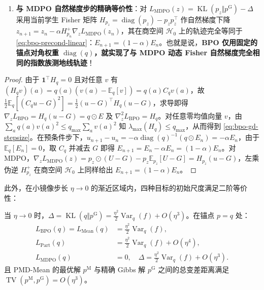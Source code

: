 \documentclass[lang=cn,scheme=chinese,openany]{../book/elegantbook}
\newcommand{\E}{\mathbb E}
\newcommand{\KL}{\operatorname{KL}}
\newcommand{\Var}{\operatorname{Var}}
\newcommand{\TV}{\operatorname{TV}}
\begin{document}
\begin{theorem}
\begin{enumerate}
\begin{equation}
  \label{eq:bpo-precond-linear}
 \end{equation}
 对任意 $\alpha\in(0,2)$ 均全局收缩，且当 $\alpha=1$ 时\textbf{一步（$N=1$）精确抵达 $E_1=0$（即 $p_1=p^{\mathrm G}$）}！
 \item \textbf{与 MDPO 自然梯度步的精确等价性}：对 $L_{\mathrm{MDPO}}(z)=\KL(p_z\Vert p^{\mathrm G})-\Delta$ 采用当前学生 Fisher 矩阵 $H_{p_z}=\operatorname{diag}(p_z)-p_z p_z^\top$ 作自然梯度下降 $z_{n+1}=z_n-\alpha H_{p_n}^+\nabla_z L_{\mathrm{MDPO}}(z_n)$，其在商空间 $\mathcal H_0$ 上的轨迹完全等同于 \cref{eq:bpo-precond-linear}：$E_{n+1}=(1-\alpha)E_n$。也就是说，\textbf{BPO 仅用固定的锚点对角权重 $\operatorname{diag}(q)$，就实现了与 MDPO 动态 Fisher 自然梯度完全相同的指数族测地线轨迹}！
\end{enumerate}
\end{theorem}
\begin{proof}
由于 $\mathbf 1^\top H_q=0$ 且对任意 $v$ 有 $(H_q v)(a)=q(a)(v(a)-\E_q[v])=q(a)C_q v(a)$，故 $\frac12\E_q[(C_q u-G)^2]=\frac12(u-G)^\top H_q(u-G)$，求导即得 $\nabla_z L_{\mathrm{BPO}}=H_q(u-G)=q\odot E$ 及 $\nabla^2_z L_{\mathrm{BPO}}=H_q$。对任意零均值向量 $v$，由 $\sum_a q(a)v(a)^2\le q_{\max}\sum_a v(a)^2$ 知 $\lambda_{\max}(H_q)\le q_{\max}$，从而得到 \cref{eq:bpo-gd-stepsize}。在预条件步下，$u_{n+1}-u_n=-\alpha\operatorname{diag}(q)^{-1}(q\odot E_n)=-\alpha E_n$，由于 $\E_q[E_n]=0$，取 $C_q$ 并减去 $G$ 即得 $E_{n+1}=E_n-\alpha E_n=(1-\alpha)E_n$。对 MDPO，$\nabla_z L_{\mathrm{MDPO}}(z)=p_z\odot(U-G)-p_z\E_{p_z}[U-G]=H_{p_z}(u-G)$，左乘伪逆 $H_{p_z}^+$ 在商空间 $\mathcal H_0$ 上同样给出 $E_{n+1}=(1-\alpha)E_n$。
\end{proof}

此外，在小镜像步长 $\eta\to 0$ 的渐近区域内，四种目标的初始尺度满足二阶等价性：
\begin{proposition}
\label{prop:ch2-eta-initial-scale}
当 $\eta\to 0$ 时，$\Delta=\KL(q\Vert p^{\mathrm G})=\frac{\eta^2}{2}\Var_q(f)+O(\eta^3)$。在锚点 $p=q$ 处：
\begin{equation}
 \begin{aligned}
 L_{\mathrm{BPO}}(q)=L_{\mathrm{Mean}}(q)&=\frac{\eta^2}{2}\Var_q(f),\\
 L_{\mathrm{Part}}(q)&=\frac{\eta^2}{2}\Var_q(f)+O(\eta^4),\\
 L_{\mathrm{MDPO}}(q)&=0,\quad \Delta=\frac{\eta^2}{2}\Var_q(f)+O(\eta^3).
 \end{aligned}
\end{equation}
且 PMD-Mean 的最优解 $p^{\mathrm M}$ 与精确 Gibbs 解 $p^{\mathrm G}$ 之间的总变差距离满足 $\TV(p^{\mathrm M},p^{\mathrm G})=O(\eta^3)$。
\end{proposition}
\end{document}
